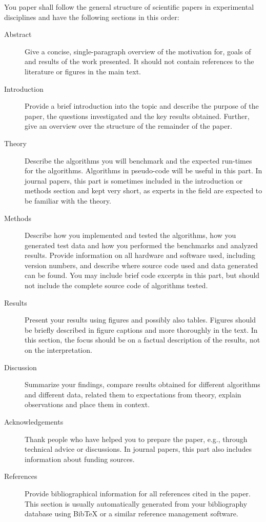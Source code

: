 \documentclass[sigconf, nonacm, natbib, screen, balance=False]{acmart}
\begin{document}
You paper shall follow the general structure of scientific papers in
experimental disciplines and have the following sections in this
order:
\begin{description}
  \item[Abstract] Give a concise, single-paragraph overview of the
    motivation for, goals of and results of the work presented. It
    should not contain references to the literature or figures in the
    main text.
  \item[Introduction] Provide a brief introduction into the topic and
    describe the purpose of the paper, the questions investigated and
    the key results obtained. Further, give an overview over the
    structure of the remainder of the paper.
  \item[Theory] Describe the algorithms you will benchmark and the
    expected run-times for the algorithms. Algorithms in pseudo-code
    will be useful in this part. In journal papers, this part is
    sometimes included in the introduction or methods section and kept
    very short, as experts in the field are expected to be familiar
    with the theory.
  \item[Methods] Describe how you implemented and tested the
    algorithms, how you generated test data and how you performed the
    benchmarks and analyzed results. Provide information on all
    hardware and software used, including version numbers, and
    describe where source code used and data generated can be
    found. You may include brief code excerpts in this part, but
    should not include the complete source code of algorithms tested.
  \item[Results] Present your results using figures and possibly also
    tables. Figures should be briefly described in figure captions and
    more thoroughly in the text. In this section, the focus should be
    on a factual description of the results, not on the
    interpretation.
  \item[Discussion] Summarize your findings, compare results obtained
    for different algorithms and different data, related them to
    expectations from theory, explain observations and place them in
    context.
  \item[Acknowledgements] Thank people who have helped you to prepare
    the paper, e.g., through technical advice or discussions. In
    journal papers, this part also includes information about funding
    sources.
  \item[References] Provide bibliographical information for all
    references cited in the paper. This section is usually
    automatically generated from your bibliography database using
    BibTeX or a similar reference management software.
  \end{description}
  
\end{document}

